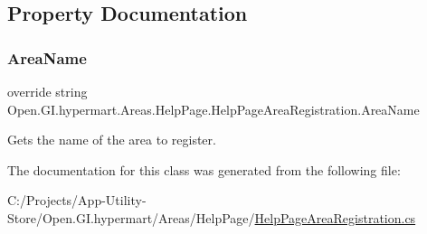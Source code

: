 \subsection{Property Documentation}
\hypertarget{class_open_1_1_g_i_1_1hypermart_1_1_areas_1_1_help_page_1_1_help_page_area_registration_a98b4d777a4852021b9a120b1eb5cd08a}{}\label{class_open_1_1_g_i_1_1hypermart_1_1_areas_1_1_help_page_1_1_help_page_area_registration_a98b4d777a4852021b9a120b1eb5cd08a} 
\subsubsection{\texorpdfstring{Area\+Name}{AreaName}}
{\footnotesize\ttfamily override string Open.\+G\+I.\+hypermart.\+Areas.\+Help\+Page.\+Help\+Page\+Area\+Registration.\+Area\+Name\hspace{0.3cm}{\ttfamily [get]}}



Gets the name of the area to register. 



The documentation for this class was generated from the following file\+:\begin{DoxyCompactItemize}
\item 
C\+:/\+Projects/\+App-\/\+Utility-\/\+Store/\+Open.\+G\+I.\+hypermart/\+Areas/\+Help\+Page/\hyperlink{_help_page_area_registration_8cs}{Help\+Page\+Area\+Registration.\+cs}\end{DoxyCompactItemize}
